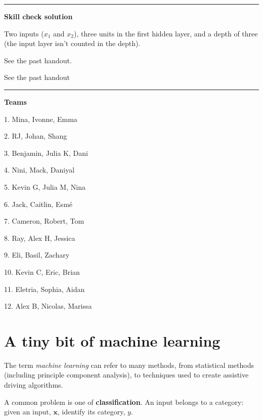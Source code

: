 \documentclass[12pt,letterpaper,noanswers]{exam}
\newcommand{\vc}[1]{\boldsymbol{#1}}
\begin{document}
\vspace{0.2cm}
\hrule
\vspace{0.2cm}

\noindent \textbf{Skill check solution}
\begin{questions}
\item Two inputs ($x_1$ and $x_2$), three units in the first hidden layer, and a depth of three (the input layer isn't counted in the depth).

\item See the past handout.

\item See the past handout
\end{questions}
\vspace{0.2cm}
\hrule
\vspace{0.2cm}

\noindent \textbf{Teams}
\begin{multicols}{3}
1. Mina, Ivonne, Emma

2.  RJ, Johan, Shang

3. Benjamin, Julia K, Dani

4. Nini, Mack, Daniyal

5. Kevin G, Julia M, Nina

6. Jack, Caitlin, Esmé

7. Cameron, Robert, Tom

8. Ray, Alex H, Jessica

9. Eli, Basil, Zachary

10.  Kevin C, Eric, Brian

11. Eletria, Sophia, Aidan

12. Alex B, Nicolas, Marissa

\end{multicols}
\section*{A tiny bit of machine learning}
The term \emph{machine learning} can refer to many methods, from statistical methods (including principle component analysis), to techniques used to create assistive driving algorithms.

A common problem is one of \textbf{classification}.  An input belongs to a category: given an input, $\vc{x}$, identify its category, $y$.
\end{document}
